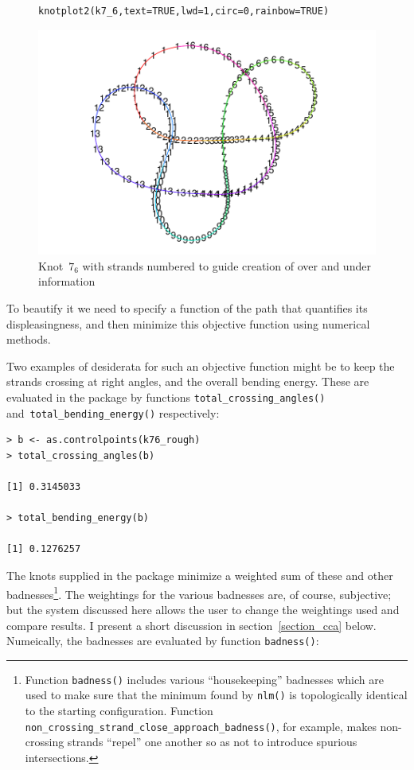\documentclass{birkjour}
\theoremstyle{definition}
\theoremstyle{remark}
\numberwithin{equation}{section}
\begin{document}
\begin{figure}[!tbp]
\begin{verbatim}
knotplot2(k7_6,text=TRUE,lwd=1,circ=0,rainbow=TRUE)
\end{verbatim}
 \centering
\includegraphics[scale = 0.9]{knot-004}
\caption{Knot~$7_6$ with strands numbered \label{k76_strands} to guide
creation of over and under information} \end{figure}

To beautify it we need to specify a function of the path that
quantifies its displeasingness, and then minimize this objective
function using numerical methods.

Two examples of desiderata for such an objective function might be to
keep the strands crossing at right angles, and the overall bending
energy.  These are evaluated in the package by functions
{\tt total\_crossing\_angles()} and~{\tt total\_bending\_energy()}
respectively:

\begin{verbatim}
> b <- as.controlpoints(k76_rough)
> total_crossing_angles(b)

[1] 0.3145033

> total_bending_energy(b)

[1] 0.1276257
\end{verbatim}

The knots supplied in the package minimize a weighted sum of these and
other badnesses\footnote{Function {\tt badness()} includes various
``housekeeping'' badnesses which are used to make sure that the
minimum found by {\tt nlm()} is topologically identical to the
starting configuration.  Function {\tt
  non\_crossing\_strand\_close\_approach\_badness()}, for example,
makes non-crossing strands ``repel'' one another so as not to
introduce spurious intersections.}.  The weightings for the various
badnesses are, of course, subjective; but the system discussed here
allows the user to change the weightings used and compare results.  I
present a short discussion in section~\ref{section_cca} below.
Numeically, the badnesses are evaluated by function {\tt badness()}:
\end{document}

